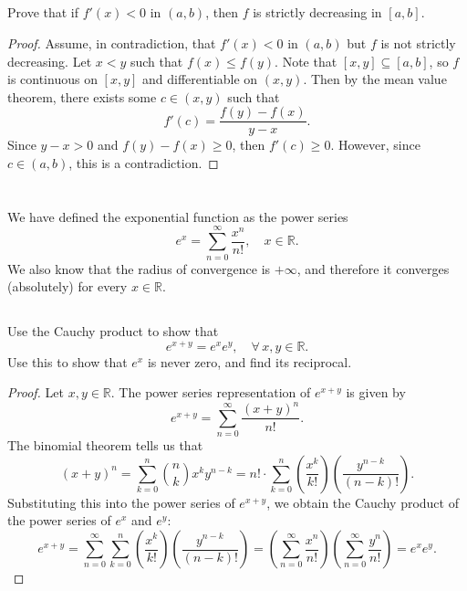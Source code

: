 \documentclass[12pt]{article}
\newenvironment{problem}
    {\begin{lrbox}{\mybox}\begin{minipage}{0.98\textwidth}}
    {\end{minipage}\end{lrbox}\begin{center}\framebox[\textwidth]{\usebox{\mybox}}\end{center}}
\theoremstyle{definition}
\newcommand{\R}{\mathbb{R}}
\begin{document}
\subsection{}
\begin{problem}
    Prove that if $f'(x)<0$ in $(a,b)$, then $f$ is strictly decreasing in $[a,b]$. 
\end{problem}

\begin{proof}
    Assume, in contradiction, that $f'(x) < 0$ in $(a, b)$ but $f$ is not strictly decreasing. Let $x < y$ such that $f(x) \leq f(y)$. Note that $[x, y] \subseteq [a, b]$, so $f$ is continuous on $[x, y]$ and differentiable on $(x, y)$. Then by the mean value theorem, there exists some $c \in (x, y)$ such that
    \[
        f'(c) = \frac{f(y) - f(x)}{y - x}.
    \]
    Since $y - x > 0$ and $f(y) - f(x) \geq 0$, then $f'(c) \geq 0$. However, since $c \in (a,b)$, this is a contradiction. 
    
\end{proof}

\newpage
\section{}
\begin{problem}
    We have defined the exponential function as the power series 
    \begin{equation}
    e^x= \sum_{n=0}^\infty \frac{x^n}{n!},\quad x\in \R.
    \end{equation}
    We also know that the radius of convergence is $+\infty$, and therefore it converges (absolutely) for every $x\in \R$.
\end{problem}

\subsection{}
\begin{problem}
    Use the Cauchy product to show that 
    \begin{equation}
        e^{x+y} = e^x e^y,\quad \forall\,x,y\in \R.
    \end{equation}
    Use this to show that $e^x$ is never zero, and find its reciprocal.
\end{problem}

\begin{proof}
    Let $x, y \in \R$. The power series representation of $e^{x + y}$ is given by
    \[
        e^{x + y} = \sum_{n=0}^\infty \frac{(x + y)^n}{n!}.
    \]
    The binomial theorem tells us that
    \[
        (x + y)^n 
            = \sum_{k=0}^n \binom{n}{k} x^k y^{n-k} 
            = n! \cdot \sum_{k=0}^n \left(\frac{x^k}{k!}\right) \left(\frac{y^{n-k}}{(n-k)!}\right).
    \]
    Substituting this into the power series of $e^{x + y}$, we obtain the Cauchy product of the power series of $e^x$ and $e^y$:
    \[
        e^{x + y} 
            = \sum_{n=0}^\infty \sum_{k=0}^n \left(\frac{x^k}{k!}\right) \left(\frac{y^{n-k}}{(n-k)!}\right)
            = \left(\sum_{n=0}^\infty \frac{x^n}{n!}\right)\left(\sum_{n=0}^\infty \frac{y^n}{n!}\right)
            =e^x e^y.
    \]
    
\end{proof}
\end{document}
